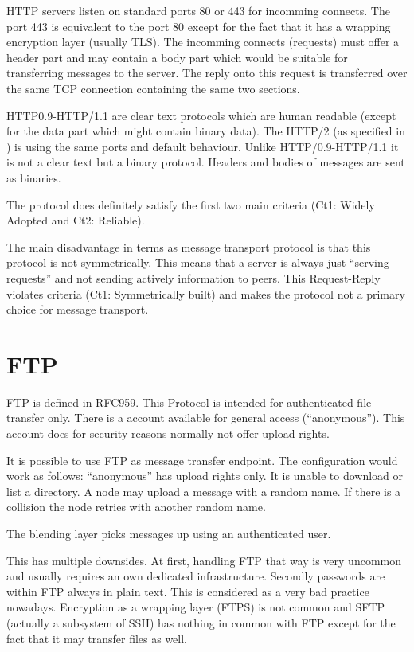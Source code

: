 HTTP servers listen on standard ports 80 or 443 for incomming connects. The port 443 is equivalent to the port 80 except for the fact that it has a wrapping encryption layer (usually TLS). The incomming connects (requests) must offer a header part and may contain a body part which would be suitable for transferring messages to the server. The reply onto this request is transferred over the same TCP connection containing the same two sections.

HTTP0.9-HTTP/1.1 are clear text protocols which are human readable (except for the data part which might contain binary data). The HTTP/2 (as specified in \cite{RFC7540}) is using the same ports and default behaviour. Unlike HTTP/0.9-HTTP/1.1 it is not a clear text but a binary protocol. Headers and bodies of messages are sent as binaries. 


The protocol does definitely satisfy the first two main criteria (Ct1: Widely Adopted and Ct2: Reliable).

The main disadvantage in terms as message transport protocol is that this protocol is not symmetrically. This means that a server is always just ``serving requests'' and not sending actively information to peers. This Request-Reply violates criteria (Ct1: Symmetrically built) and makes the protocol not a primary choice for  message transport. 

\section{FTP}
FTP is defined in RFC959\cite{RFC959}. This Protocol is intended for authenticated file transfer only. There is a account available for general access (``anonymous''). This account does for security reasons normally not offer upload rights.

It is possible to use FTP as message transfer endpoint. The configuration would work as follows: ``anonymous'' has upload rights only. It is unable to download or list a directory. A node may upload a message with a random name. If there is a collision the node retries with another random name.

The blending layer picks messages up using an authenticated user.

This has multiple downsides. At first, handling FTP that way is very uncommon and usually requires an own dedicated infrastructure. Secondly passwords are within FTP always in plain text. This is considered as a very bad practice nowadays. Encryption as a wrapping layer (FTPS) is not common and SFTP (actually a subsystem of SSH) has nothing in common with FTP except for the fact that it may transfer files as well.

